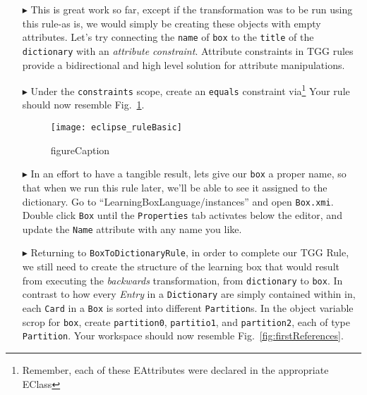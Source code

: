 \begin{itemize}
\item[$\blacktriangleright$] This is great work so far, except if the transformation was to be run using this rule-as is, we would simply be creating these
objects with empty attributes. Let's try connecting the \texttt{name} of \texttt{box} to the \texttt{title} of the \texttt{dictionary} with an \emph{attribute
constraint}. Attribute constraints in TGG rules provide a bidirectional and high level solution for attribute manipulations.

\item[$\blacktriangleright$] Under the \texttt{constraints} scope, create an \texttt{equals} constraint via\footnote{Remember, each of these EAttributes were
declared in the appropriate EClass}
Your rule should now resemble Fig.~\ref{fig:ruleBasic}.

\begin{figure}[htbp]
\begin{center}
  \texttt{[image: eclipse\_ruleBasic]}
  \caption{figureCaption}
  \label{fig:ruleBasic}
\end{center}
\end{figure}

\item[$\blacktriangleright$] In an effort to have a tangible result, lets give our \texttt{box} a proper name, so that when we run this rule later, we'll be
able to see it assigned to the dictionary. Go to ``LearningBoxLanguage/instances'' and open \texttt{Box.xmi}. Double click \texttt{Box} until the
\texttt{Properties} tab activates below the editor, and update the \texttt{Name} attribute with any name you like.


\item[$\blacktriangleright$] Returning to \texttt{BoxToDictionaryRule}, in order to complete our TGG Rule, we still need to create the structure of the learning
box that would result from executing the \emph{backwards} transformation, from \texttt{dictionary} to \texttt{box}. In contrast to how every \emph{Entry} in a
\texttt{Dictionary} are simply contained within in, each \texttt{Card} in a \texttt{Box} is sorted into different \texttt{Partition}s. In the object variable
scrop for \texttt{box}, create \texttt{partition0}, \texttt{partitio1}, and \texttt{partition2}, each of type \texttt{Partition}. Your workspace should now
resemble Fig.~\ref{fig:firstReferences}.


\end{itemize}
